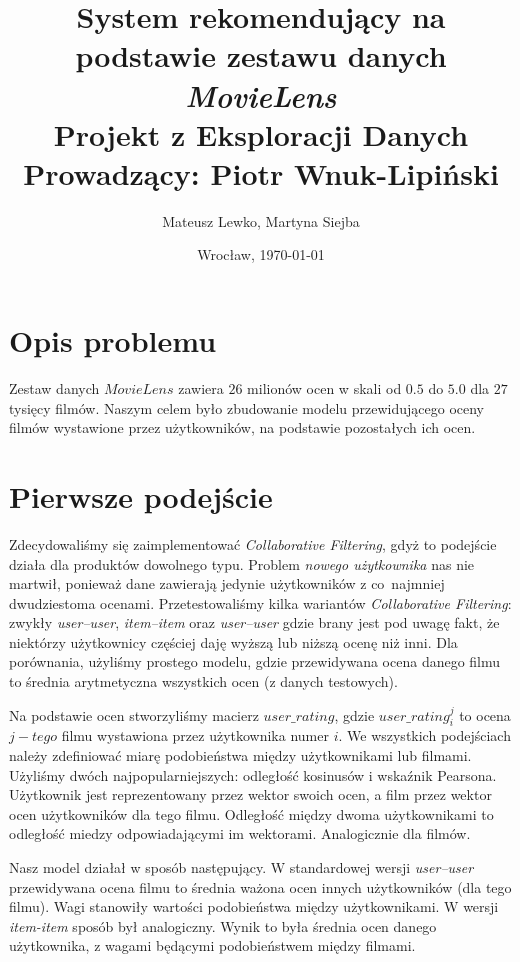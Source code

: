 \documentclass[11pt,wide]{mwart}
\date{Wrocław, \today}
\title{\Large\textbf{System rekomendujący na podstawie zestawu danych \textit{MovieLens}}\\Projekt z Eksploracji Danych\\[1ex] \small Prowadzący: Piotr Wnuk-Lipiński}
\author{Mateusz Lewko, Martyna Siejba}
\begin{document}
\maketitle
\thispagestyle {empty}

\tableofcontents

\section{Opis problemu}
Zestaw danych $MovieLens$ zawiera $26$ milionów ocen w skali od $0.5$ do $5.0$ dla $27$ tysięcy filmów. Naszym celem było zbudowanie modelu przewidującego oceny filmów wystawione przez użytkowników, na podstawie pozostałych ich ocen.

\section{Pierwsze podejście}

Zdecydowaliśmy się zaimplementować \textit{Collaborative Filtering}, gdyż to podejście działa dla produktów dowolnego typu. Problem \textit{nowego użytkownika} nas nie martwił, ponieważ dane zawierają jedynie użytkowników z co~najmniej dwudziestoma ocenami. Przetestowaliśmy kilka wariantów \textit{Collaborative Filtering}: zwykły \textit{user--user}, \textit{item--item} oraz \textit{user--user} gdzie brany jest pod uwagę fakt, że niektórzy użytkownicy częściej daję wyższą lub niższą ocenę niż inni. Dla porównania, użyliśmy prostego modelu, gdzie przewidywana ocena danego filmu to średnia arytmetyczna wszystkich ocen (z danych testowych).

Na podstawie ocen stworzyliśmy macierz $user\_rating$, gdzie
$user\_rating_{i}^{j}$ to ocena $j-tego$ filmu wystawiona przez użytkownika numer $i$. 
We wszystkich podejściach należy zdefiniować miarę podobieństwa między użytkownikami lub filmami. Użyliśmy dwóch najpopularniejszych: odległość kosinusów i wskaźnik Pearsona. Użytkownik jest reprezentowany przez wektor swoich ocen, a film przez wektor ocen użytkowników dla tego filmu. Odległość między dwoma użytkownikami to odległość miedzy odpowiadającymi im wektorami. Analogicznie dla filmów.

Nasz model działał w sposób następujący. W standardowej wersji \textit{user--user}
przewidywana ocena filmu to średnia ważona ocen innych użytkowników (dla tego filmu). Wagi stanowiły wartości podobieństwa między użytkownikami. W wersji \textit{item-item} sposób był analogiczny. Wynik to była średnia ocen danego użytkownika, z wagami będącymi podobieństwem między filmami.
\end{document}
